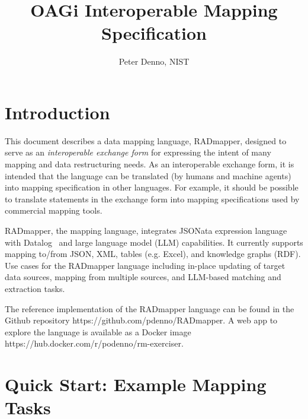 \documentclass[10pt,letterpaper]{article} %
\begin{document}
\title{OAGi Interoperable Mapping Specification}
\author{Peter Denno, NIST}
\maketitle{}

\section{Introduction}
This document describes a data mapping language, RADmapper, designed to serve as an \textit{interoperable exchange form} for expressing the intent of many mapping and data restructuring needs.
As an interoperable exchange form, it is intended that the language can be translated (by humans and machine agents) into mapping specification in other languages.
For example, it should be possible to translate statements in the exchange form into mapping specifications used by commercial mapping tools.

RADmapper, the mapping language, integrates JSONata expression language~\cite{Jsonata.org2021} with Datalog~\cite{Abiteboul1995a} and large language model (LLM) capabilities.
It currently supports mapping to/from JSON, XML, tables (e.g. Excel), and knowledge graphs (RDF).
Use cases for the RADmapper language including in-place updating of target data sources, mapping from multiple sources, and LLM-based matching and extraction tasks.

\begin{sloppypar} %
The reference implementation of the RADmapper language can be found in the Github repository https://github.com/pdenno/RADmapper.
A web app to explore the language is available as a Docker image https://hub.docker.com/r/podenno/rm-exerciser.
\end{sloppypar}

\section{Quick Start: Example Mapping Tasks}
\end{document}
